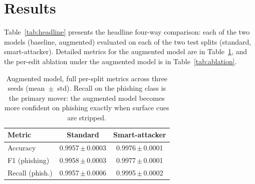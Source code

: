 \documentclass[conference]{IEEEtran}
\begin{document}
\section{Results}
\label{sec:results}

Table~\ref{tab:headline} presents the headline four-way comparison: each of the
two models (baseline, augmented) evaluated on each of the two test splits
(standard, smart-attacker). Detailed metrics for the augmented model are in
Table~\ref{tab:augfull}, and the per-edit ablation under the augmented model
is in Table~\ref{tab:ablation}.

\begin{table}[t]
\caption{Headline results across three seeds (mean~$\pm$~std). The vanilla
baseline is essentially insensitive to the smart-attacker edits ($\Delta$
within seed noise). Augmentation produces a clean $+0.0020$ F1 gain on the
smart-attacker test at zero cost on the standard test.}
\label{tab:headline}
\centering
{}
\end{table}

\begin{table}[t]
\caption{Augmented model, full per-split metrics across three seeds
(mean~$\pm$~std). Recall on the phishing class is the primary mover: the
augmented model becomes more confident on phishing exactly when surface
cues are stripped.}
\label{tab:augfull}
\centering
\begin{tabular}{lcc}
\toprule
\textbf{Metric} & \textbf{Standard} & \textbf{Smart-attacker} \\
\midrule
Accuracy        & 0.9957\,$\pm$\,0.0003 & 0.9976\,$\pm$\,0.0001 \\
F1 (phishing)   & 0.9958\,$\pm$\,0.0003 & 0.9977\,$\pm$\,0.0001 \\
Recall (phish.) & 0.9957\,$\pm$\,0.0006 & 0.9995\,$\pm$\,0.0002 \\
\bottomrule
\end{tabular}
\end{table}
\end{document}
